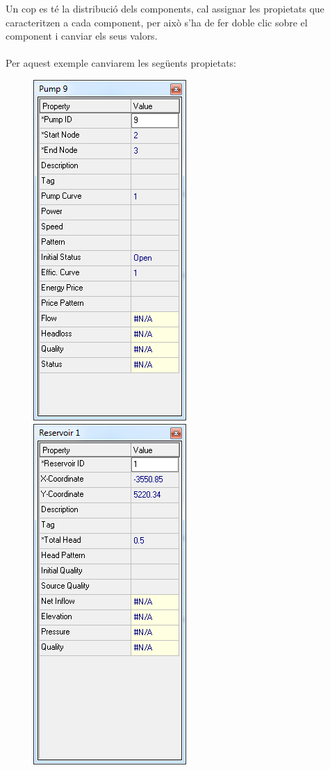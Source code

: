 \documentclass[12pt]{article}
\begin{document}
Un cop es té la distribució dels components, cal assignar les propietats que caracteritzen a cada component, per això s'ha de fer doble clic sobre el component i canviar els seus valors.
\\\\Per aquest exemple canviarem les següents propietats: 
\begin{figure}[h!]
	\centering
	\includegraphics[scale=0.35]{imatges/epanet/car/bomba.png}
	\includegraphics[scale=0.35]{imatges/epanet/car/diposit.png}

\end{figure}
\end{document}
